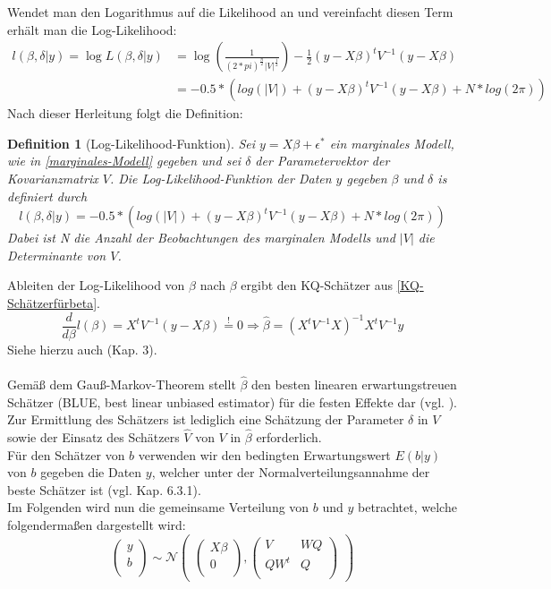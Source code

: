 \documentclass[%
thesis=student,%
coverpage=false,%
titlepage=false,%
headmarks=true, %
german,%
font=libertine, %
math=newpxtx, %
BCOR=5mm,%
coverBCOR=11mm%
]{tumbook}
\theoremstyle{break}
\newtheorem{definition}{Definition}[section]
\begin{document}
Wendet man den Logarithmus auf die Likelihood an und vereinfacht diesen Term erhält man die Log-Likelihood: 
\begin{align}
	l(\beta,\delta|y) = \log L(\beta,\delta|y) &= \log(\frac{1}{(2*pi)^{\frac{n}{2}} |V|^{\frac{1}{2}}}) - \frac{1}{2} (y-X\beta)^t V^{-1}(y-X\beta) \\
	&= -0.5 *(log(|V|)+ (y-X\beta)^t V^{-1}(y-X\beta) + N * log(2\pi))
\end{align}
Nach dieser Herleitung folgt die Definition:
\begin{definition}[Log-Likelihood-Funktion]
	Sei $y = X\beta + \epsilon^*$ ein marginales Modell, wie in  \ref{marginales-Modell} gegeben und sei $\delta$ der Parametervektor der Kovarianzmatrix $V$.
	Die Log-Likelihood-Funktion der Daten $y$ gegeben $\beta$ und $\delta$ is definiert durch
	$$ l(\beta,\delta|y) = -0.5 *(log(|V|)+ (y-X\beta)^t V^{-1}(y-X\beta) + N * log(2\pi))$$
	Dabei ist N die Anzahl der Beobachtungen des marginalen Modells und $|V|$ die Determinante von $V$.
\end{definition}\noindent
Ableiten der Log-Likelihood von $\beta$ nach $\beta$ ergibt den KQ-Schätzer aus \ref{KQ-Schätzerfürbeta}.
$$\frac{d}{d\beta}l(\beta) = X^t V^{-1} (y-X\beta) \stackrel{!}{=} 0  \Rightarrow \hat{\beta} = (X^t V^{-1}X)^{-1}X^t V^{-1}y$$
Siehe hierzu auch \cite{fahrmeir-2011-regression} (Kap. 3).\\
\\
Gemäß dem Gauß-Markov-Theorem stellt $\hat{\beta}$ den besten linearen erwartungstreuen Schätzer (BLUE, best linear unbiased estimator) für die festen Effekte dar (vgl. \cite{Statistik-Wiwi}). Zur Ermittlung des Schätzers ist lediglich eine Schätzung der Parameter $\delta$ in $V$ sowie der Einsatz des Schätzers $\hat{V} $ von $V$ in $\hat{\beta}$ erforderlich. \\
Für den Schätzer von $b$ verwenden wir den bedingten Erwartungswert $E(b|y)$ von $b$ gegeben die Daten $y$, welcher unter der Normalverteilungsannahme der beste Schätzer ist (vgl. \cite{fahrmeir-2011-regression} Kap. 6.3.1). \\
Im Folgenden wird nun die gemeinsame Verteilung von $b$ und $y$ betrachtet, welche folgendermaßen dargestellt wird:
$$\begin{pmatrix}
	y \\
	b \\
\end{pmatrix}
\sim
\mathcal{N}
\begin{pmatrix}
	\begin{pmatrix}
		X\beta \\
		0 \\
	\end{pmatrix},
	\begin{pmatrix}
		V & W Q \\
		Q W^t & Q \\
	\end{pmatrix}
\end{pmatrix}$$
\end{document}
